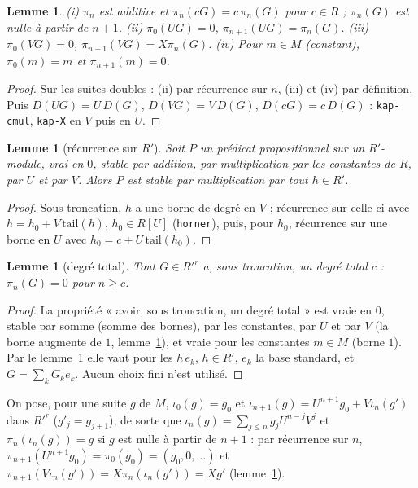 \documentclass[11pt]{amsart}
\newtheorem{lemma}[theorem]{Lemme}
\theoremstyle{definition}
\theoremstyle{remark}
\begin{document}
\begin{lemma}\label{lem:pi}
(i) $\pi_n$ est additive et $\pi_n(cG)=c\,\pi_n(G)$ pour $c\in R$ ;
$\pi_n(G)$ est nulle à partir de $n+1$.
(ii) $\pi_0(UG)=0$, $\pi_{n+1}(UG)=\pi_n(G)$.
(iii) $\pi_0(VG)=0$, $\pi_{n+1}(VG)=X\pi_n(G)$.
(iv) Pour $m\in M$ (constant), $\pi_0(m)=m$ et $\pi_{n+1}(m)=0$.
\end{lemma}

\begin{proof}
Sur les suites doubles : (ii) par récurrence sur $n$, (iii) et (iv) par
définition. Puis $D(UG)=U\,D(G)$, $D(VG)=V\,D(G)$, $D(cG)=c\,D(G)$ :
\texttt{kap-cmul}, \texttt{kap-X} en $V$ puis en $U$.
\end{proof}

\begin{lemma}[récurrence sur $R'$]\label{lem:rind}
Soit $P$ un prédicat propositionnel sur un $R'$-module, vrai en $0$,
stable par addition, par multiplication par les constantes de $R$, par
$U$ et par $V$. Alors $P$ est stable par multiplication par tout
$h\in R'$.
\end{lemma}

\begin{proof}
Sous troncation, $h$ a une borne de degré en $V$ ; récurrence sur
celle-ci avec $h=h_0+V\,\mathrm{tail}(h)$, $h_0\in R[U]$ (\texttt{horner}),
puis, pour $h_0$, récurrence sur une borne en $U$ avec
$h_0=c+U\,\mathrm{tail}(h_0)$.
\end{proof}

\begin{lemma}[degré total]\label{lem:tot}
Tout $G\in R'^r$ a, sous troncation, un degré total $c$ : $\pi_n(G)=0$
pour $n\ge c$.
\end{lemma}

\begin{proof}
La propriété « avoir, sous troncation, un degré total » est vraie en $0$,
stable par somme (somme des bornes), par les constantes, par $U$ et par
$V$ (la borne augmente de $1$, lemme~\ref{lem:pi}), et vraie pour les
constantes $m\in M$ (borne $1$). Par le lemme~\ref{lem:rind} elle vaut
pour les $h\,e_k$, $h\in R'$, $e_k$ la base standard, et
$G=\sum_kG_ke_k$. Aucun choix fini n'est utilisé.
\end{proof}

On pose, pour une suite $g$ de $M$,
$\iota_0(g)=g_0$ et $\iota_{n+1}(g)=U^{n+1}g_0+V\iota_n(g')$ dans
$R'^r$ ($g'_j=g_{j+1}$), de sorte que $\iota_n(g)=\sum_{j\le n}g_jU^{n-j}V^j$
et $\pi_n(\iota_n(g))=g$ si $g$ est nulle à partir de $n+1$ : par
récurrence sur $n$, $\pi_{n+1}(U^{n+1}g_0)=\pi_0(g_0)=(g_0,0,\dots)$ et
$\pi_{n+1}(V\iota_n(g'))=X\pi_n(\iota_n(g'))=Xg'$ (lemme~\ref{lem:pi}).
\end{document}
